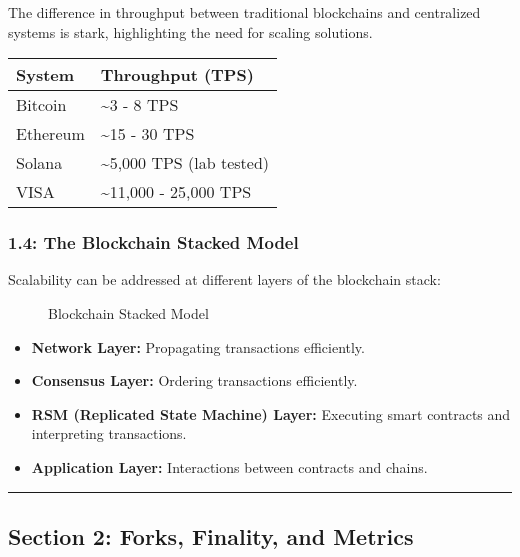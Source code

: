 The difference in throughput between traditional blockchains and
centralized systems is stark, highlighting the need for scaling
solutions.

\begin{longtable}[]{@{}ll@{}}
\toprule\noalign{}
System & Throughput (TPS) \\
\midrule\noalign{}
\endhead
\bottomrule\noalign{}
\endlastfoot
Bitcoin & \textasciitilde3 - 8 TPS \\
Ethereum & \textasciitilde15 - 30 TPS \\
Solana & \textasciitilde5,000 TPS (lab tested) \\
VISA & \textasciitilde11,000 - 25,000 TPS \\
\end{longtable}

\subsubsection{1.4: The Blockchain Stacked
Model}\label{the-blockchain-stacked-model}

Scalability can be addressed at different layers of the blockchain
stack:

\begin{figure}
\centering
\caption{Blockchain Stacked Model}
\end{figure}

\begin{itemize}
\tightlist
\item
  \textbf{Network Layer:} Propagating transactions efficiently.
\item
  \textbf{Consensus Layer:} Ordering transactions efficiently.
\item
  \textbf{RSM (Replicated State Machine) Layer:} Executing smart
  contracts and interpreting transactions.
\item
  \textbf{Application Layer:} Interactions between contracts and chains.
\end{itemize}

\begin{center}\rule{0.5\linewidth}{0.5pt}\end{center}

\subsection{Section 2: Forks, Finality, and
Metrics}\label{section-2-forks-finality-and-metrics}

